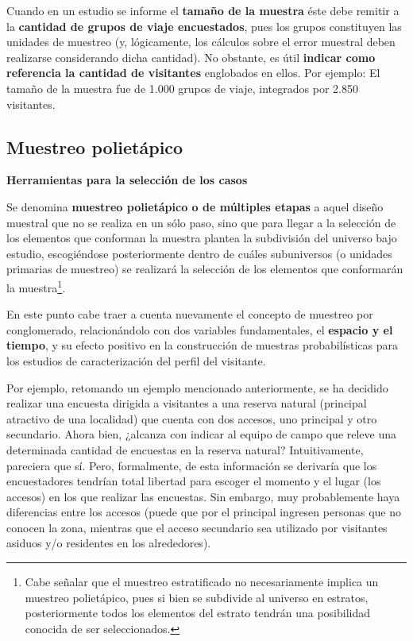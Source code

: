 \documentclass[
]{book}
\begin{document}
Cuando en un estudio se informe el \textbf{tamaño de la muestra} éste debe remitir a la \textbf{cantidad de grupos de viaje encuestados}, pues los grupos constituyen las unidades de muestreo (y, lógicamente, los cálculos sobre el error muestral deben realizarse considerando dicha cantidad). No obstante, es útil \textbf{indicar como referencia la cantidad de visitantes} englobados en ellos. Por ejemplo: El tamaño de la muestra fue de 1.000 grupos de viaje, integrados por 2.850 visitantes.

\hypertarget{muestreo-polietuxe1pico}{%
\subsection{Muestreo polietápico}\label{muestreo-polietuxe1pico}}

\textbf{Herramientas para la selección de los casos}

Se denomina \textbf{muestreo polietápico o de múltiples etapas} a aquel diseño muestral que no se realiza en un sólo paso, sino que para llegar a la selección de los elementos que conforman la muestra plantea la subdivisión del universo bajo estudio, escogiéndose posteriormente dentro de cuáles subuniversos (o unidades primarias de muestreo) se realizará la selección de los elementos que conformarán la muestra\footnote{Cabe señalar que el muestreo estratificado no necesariamente implica un muestreo polietápico, pues si bien se subdivide al universo en estratos, posteriormente todos los elementos del estrato tendrán una posibilidad conocida de ser seleccionados.}.

En este punto cabe traer a cuenta nuevamente el concepto de muestreo por conglomerado, relacionándolo con dos variables fundamentales, el \textbf{espacio y el tiempo}, y su efecto positivo en la construcción de muestras probabilísticas para los estudios de caracterización del perfil del visitante.

Por ejemplo, retomando un ejemplo mencionado anteriormente, se ha decidido realizar una encuesta dirigida a visitantes a una reserva natural (principal atractivo de una localidad) que cuenta con dos accesos, uno principal y otro secundario. Ahora bien, ¿alcanza con indicar al equipo de campo que releve una determinada cantidad de encuestas en la reserva natural? Intuitivamente, pareciera que sí. Pero, formalmente, de esta información se derivaría que los encuestadores tendrían total libertad para escoger el momento y el lugar (los accesos) en los que realizar las encuestas. Sin embargo, muy probablemente haya diferencias entre los accesos (puede que por el principal ingresen personas que no conocen la zona, mientras que el acceso secundario sea utilizado por visitantes asiduos y/o residentes en los alrededores).
\end{document}
